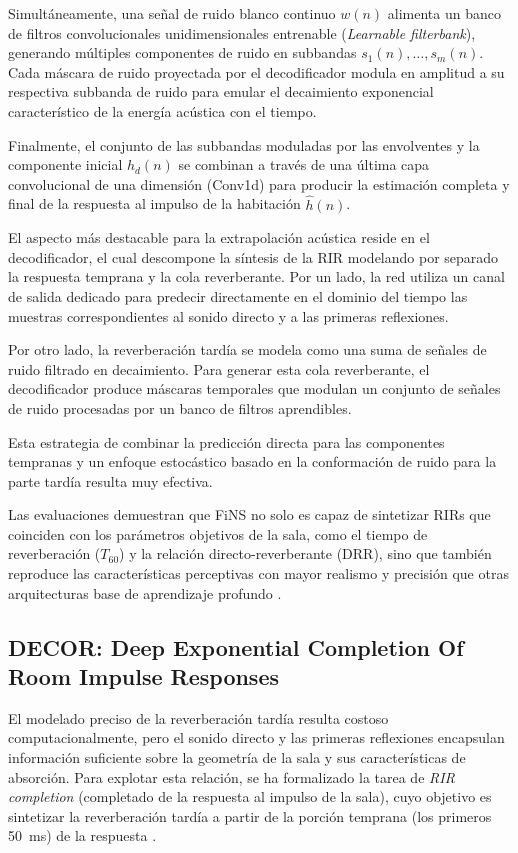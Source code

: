Simultáneamente, una señal de ruido blanco continuo $w(n)$ alimenta un banco de filtros convolucionales unidimensionales entrenable (\textit{Learnable filterbank}), generando múltiples componentes de ruido en subbandas $s_1(n), \dots, s_m(n)$. Cada máscara de ruido proyectada por el decodificador modula en amplitud a su respectiva subbanda de ruido para emular el decaimiento exponencial característico de la energía acústica con el tiempo.

Finalmente, el conjunto de las subbandas moduladas por las envolventes y la componente inicial $h_d(n)$ se combinan a través de una última capa convolucional de una dimensión (Conv1d) para producir la estimación completa y final de la respuesta al impulso de la habitación $\hat{h}(n)$.

El aspecto más destacable para la extrapolación acústica reside en el decodificador, el cual descompone la síntesis de la RIR modelando por separado la respuesta temprana y la cola reverberante. Por un lado, la red utiliza un canal de salida dedicado para predecir directamente en el dominio del tiempo las muestras correspondientes al sonido directo y a las primeras reflexiones.

Por otro lado, la reverberación tardía se modela como una suma de señales de ruido filtrado en decaimiento. Para generar esta cola reverberante, el decodificador produce máscaras temporales que modulan un conjunto de señales de ruido procesadas por un banco de filtros aprendibles.

Esta estrategia de combinar la predicción directa para las componentes tempranas y un enfoque estocástico basado en la conformación de ruido para la parte tardía resulta muy efectiva.

Las evaluaciones demuestran que FiNS no solo es capaz de sintetizar RIRs que coinciden con los parámetros objetivos de la sala, como el tiempo de reverberación ($T_{60}$) y la relación directo-reverberante (DRR), sino que también reproduce las características perceptivas con mayor realismo y precisión que otras arquitecturas base de aprendizaje profundo \cite{Steinmetz2021FiNS}.



\subsection[DECOR]{DECOR: Deep Exponential Completion Of Room Impulse Responses}

El modelado preciso de la reverberación tardía resulta costoso computacionalmente, pero el sonido directo y las primeras reflexiones encapsulan información suficiente sobre la geometría de la sala y sus características de absorción. Para explotar esta relación, se ha formalizado la tarea de \textit{RIR completion} (completado de la respuesta al impulso de la sala), cuyo objetivo es sintetizar la reverberación tardía a partir de la porción temprana (los primeros 50~ms) de la respuesta \cite{Lin25}.

